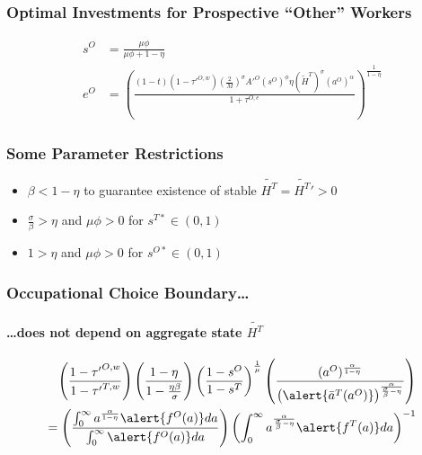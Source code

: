 \documentclass[11pt]{beamer}
\begin{document}
\begin{frame}
\frametitle{Optimal Investments for Prospective ``Other'' Workers} 
\begin{align}
s^{O} & = \frac{\mu \phi}{\mu \phi+1-\eta} \nonumber \\
e^{O} & = \left( \frac{(1-t)(1-{\tau'}^{O,w})\left(\tfrac{2}{M}\right)^\sigma {A'}^O (s^{O})^\phi \eta \left(\widetilde{H}^T\right)^\sigma \left(a^{O}\right)^\alpha}{1+\tau^{O,e}} \right)^\frac{1}{1-\eta} \nonumber
\end{align}
\end{frame}

\begin{frame}
\frametitle{Some Parameter Restrictions}
\begin{itemize}
  \item $\beta < 1-\eta$ to guarantee existence of stable $\widetilde{H^T} = \widetilde{H^T}' > 0$
  \item $\tfrac{\sigma}{\beta} > \eta$ and $\mu \phi > 0$ for $s^{T*} \in (0,1)$
  \item $1 > \eta$ and $\mu \phi > 0$ for $s^{O*} \in (0,1)$
\end{itemize}
\end{frame}


\begin{frame}
\frametitle{Occupational Choice Boundary\ldots}
\framesubtitle{\ldots does not depend on aggregate state $\widetilde{H^T}$} 
\begin{align}
\left(\frac{1-{\tau'}^{O,w}}{1-{\tau'}^{T,w}}\right) \left(\frac{1-\eta}{1-\tfrac{\eta\beta}{\sigma}}\right)  \left(\frac{1-s^{O}}{1-s^{T}}\right)^{\frac{1}{\mu}}  \left(\frac{(a^O)^\frac{\alpha}{1-\eta}}{\big(\alert{\bar{a}^T(a^O)}\big)^\frac{\alpha}{\frac{\sigma}{\beta}-\eta}} \right) \nonumber\\
= \left(\frac{\int_0^\infty a^\frac{\alpha}{1-\eta} \alert{f^O(a)} da}{\int_0^\infty \alert{f^O(a)} da} \right) \left(\int_0^\infty a^\frac{\alpha}{\frac{\sigma}{\beta}-\eta} \alert{f^T(a)} da\right)^{-1} \nonumber
\end{align}
\end{frame}
\end{document}
